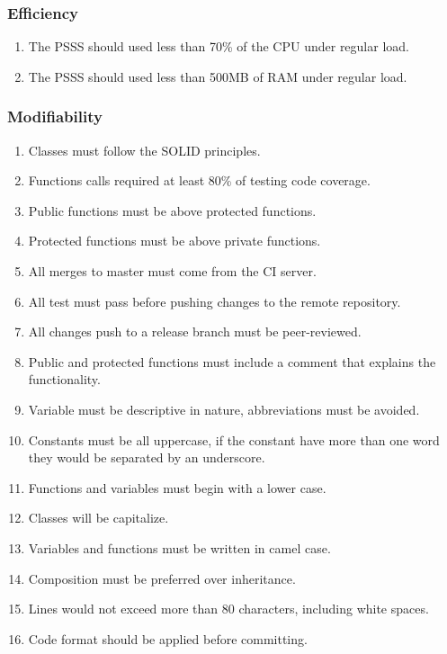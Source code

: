 \subsubsection{Efficiency}
\begin{enumerate}[label=EFF-\arabic*]
    \item The PSSS should used less than 70\% of the CPU under regular load.
    \item The PSSS should used less than 500MB of RAM under regular load.
\end{enumerate}

\pagebreak

\subsubsection{Modifiability}
\begin{enumerate}[label=MOD-\arabic*]
    \item Classes must follow the SOLID principles. \cite{solid}
    \item Functions calls required at least 80\% of testing code coverage.
    \item Public functions must be above protected functions.
    \item Protected functions must be above private functions.
    \item All merges to master must come from the CI server.
    \item All test must pass before pushing changes to the remote repository.
    \item All changes push to a release branch must be peer-reviewed.
    \item Public and protected functions must include a comment that explains 
    the functionality.
    \item Variable must be descriptive in nature, abbreviations must be 
    avoided.
    \item Constants must be all uppercase, if the constant have more than one 
    word they would be separated by an underscore.
    \item Functions and variables must begin with a lower case.
    \item Classes will be capitalize.
    \item Variables and functions must be written in camel case.
    \item Composition must be preferred over inheritance.
    \item Lines would not exceed more than 80 characters, including white 
    spaces.
    \item Code format should be applied before committing.
\end{enumerate}
\pagebreak

